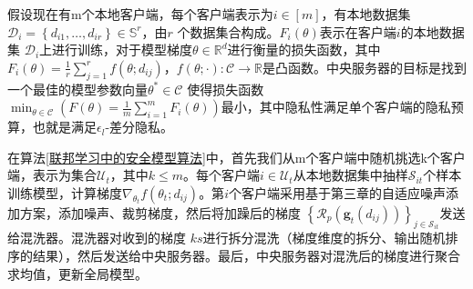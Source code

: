 假设现在有m个本地客户端，每个客户端表示为$i \in[m]$，有本地数据集\\$\mathcal{D}_{i}=\left\{d_{i 1}, \ldots, d_{i r}\right\} \in \mathbb{S}^{r}$，由$r$ 个数据集合构成。$F_{i}(\theta)$表示在客户端$i$的本地数据集 $\mathcal{D}_{i}$上进行训练，对于模型梯度$\theta \in \mathbb{R}^{d}$进行衡量的损失函数，其中$F_{i}(\theta)=\frac{1}{r} \sum_{j=1}^{r} f\left(\theta ; d_{i j}\right)$，$f(\theta ; \cdot): \mathcal{C} \rightarrow \mathbb{R}$是凸函数。中央服务器的目标是找到一个最佳的模型参数向量$\theta^{*} \in \mathcal{C}$ 使得损失函数$\min _{\theta \in \mathcal{C}}\left(F(\theta)=\frac{1}{m} \sum_{i=1}^{m} F_{i}(\theta)\right)$最小，其中隐私性满足单个客户端的隐私预算，也就是满足$\epsilon_{l}$-差分隐私。

在算法\ref{联邦学习中的安全模型算法}中，首先我们从m个客户端中随机挑选k个客户端，表示为集合$\mathcal{U}_{t}$，其中$k \leq m$。每个客户端$i \in \mathcal{U}_{t}$从本地数据集中抽样$\mathcal{S}_{i t}$个样本训练模型，计算梯度$\nabla_{\theta_{t}} f\left(\theta_{t} ; d_{i j}\right)$。第$i$个客户端采用基于第三章的自适应噪声添加方案，添加噪声、裁剪梯度，然后将加躁后的梯度 $\left\{\mathcal{R}_{p}\left(\mathbf{g}_{t}\left(d_{i j}\right)\right)\right\}_{j \in \mathcal{S}_{i t}}$发送给混洗器。混洗器对收到的梯度 $k s$进行拆分混洗（梯度维度的拆分、输出随机排序的结果），然后发送给中央服务器。最后，中央服务器对混洗后的梯度进行聚合求均值，更新全局模型。


